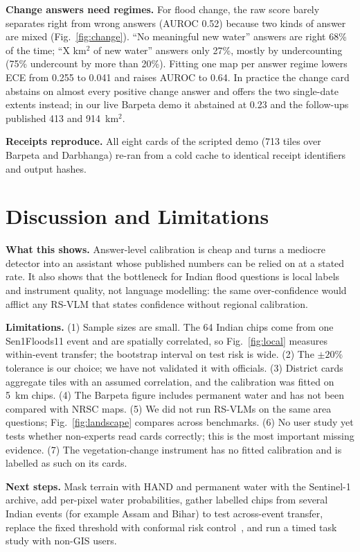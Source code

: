 \documentclass[conference]{IEEEtran}
\begin{document}
\textbf{Change answers need regimes.} For flood change, the raw score barely separates right from wrong answers (AUROC 0.52) because two kinds of answer are mixed (Fig.~\ref{fig:change}). ``No meaningful new water'' answers are right 68\% of the time; ``X km$^2$ of new water'' answers only 27\%, mostly by undercounting (75\% undercount by more than 20\%). Fitting one map per answer regime lowers ECE from 0.255 to 0.041 and raises AUROC to 0.64. In practice the change card abstains on almost every positive change answer and offers the two single-date extents instead; in our live Barpeta demo it abstained at 0.23 and the follow-ups published 413 and 914~km$^2$.

\textbf{Receipts reproduce.} All eight cards of the scripted demo (713 tiles over Barpeta and Darbhanga) re-ran from a cold cache to identical receipt identifiers and output hashes.

\section{Discussion and Limitations}

\textbf{What this shows.} Answer-level calibration is cheap and turns a mediocre detector into an assistant whose published numbers can be relied on at a stated rate. It also shows that the bottleneck for Indian flood questions is local labels and instrument quality, not language modelling: the same over-confidence would afflict any RS-VLM that states confidence without regional calibration.

\textbf{Limitations.} (1) Sample sizes are small. The 64 Indian chips come from one Sen1Floods11 event and are spatially correlated, so Fig.~\ref{fig:local} measures within-event transfer; the bootstrap interval on test risk is wide. (2) The $\pm20\%$ tolerance is our choice; we have not validated it with officials. (3) District cards aggregate tiles with an assumed correlation, and the calibration was fitted on 5~km chips. (4) The Barpeta figure includes permanent water and has not been compared with NRSC maps. (5) We did not run RS-VLMs on the same area questions; Fig.~\ref{fig:landscape} compares across benchmarks. (6) No user study yet tests whether non-experts read cards correctly; this is the most important missing evidence. (7) The vegetation-change instrument has no fitted calibration and is labelled as such on its cards.

\textbf{Next steps.} Mask terrain with HAND and permanent water with the Sentinel-1 archive, add per-pixel water probabilities, gather labelled chips from several Indian events (for example Assam and Bihar) to test across-event transfer, replace the fixed threshold with conformal risk control~\cite{angelopoulos2021raps}, and run a timed task study with non-GIS users.
\end{document}
